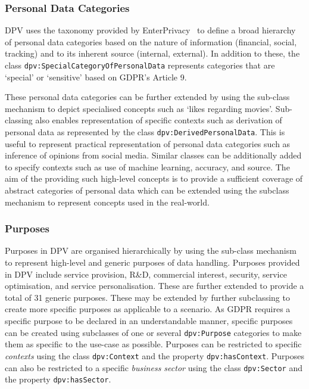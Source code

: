 \subsubsection{Personal Data Categories}
DPV uses the taxonomy provided by EnterPrivacy~\cite{enterprivacy} to define a broad hierarchy of personal data categories based on the nature of information (financial, social, tracking) and to its inherent source (internal, external). 
In addition to these, the class \texttt{dpv:Special\-Category\-Of\-PersonalData} represents categories that are `special' or `sensitive' based on GDPR’s Article 9.

These personal data categories can be further extended by using the sub-class mechanism to depict specialised concepts such as `likes regarding movies'.
Sub-classing also enables representation of specific contexts such as derivation of personal data as represented by the class \texttt{dpv:DerivedPersonalData}.
This is useful to represent practical representation of personal data categories such as inference of opinions from social media.
Similar classes can be additionally added to specify contexts such as use of machine learning, accuracy, and source.
The aim of the providing such high-level concepts is to provide a sufficient coverage of abstract categories of personal data which can be extended using the subclass mechanism to represent concepts used in the real-world. 

\subsubsection{Purposes}
Purposes in DPV are organised hierarchically by using the sub-class mechanism to represent high-level and generic purposes of data handling.
Purposes provided in DPV include service provision, R\&D, commercial interest, security, service optimisation, and service personalisation. These are further extended to provide a total of 31 generic purposes.
These may be extended by further subclassing to create more specific purposes as applicable to a scenario.
As GDPR requires a specific purpose to be declared in an understandable manner, specific purposes can be created using subclasses of one or several \texttt{dpv:Purpose} categories to make them as specific to the use-case as possible.
 Purposes can be restricted to specific \emph{contexts} using the class \texttt{dpv:Context} and the property \texttt{dpv:hasContext}.
Purposes can also be restricted to a specific \emph{business sector} using the class \texttt{dpv:Sector} and the property \texttt{dpv:hasSector}.

